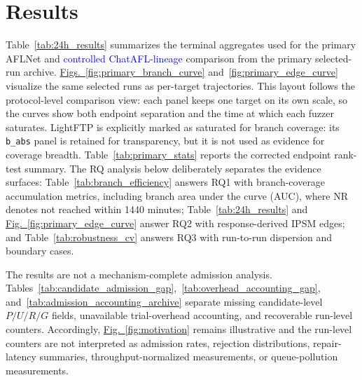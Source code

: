 \documentclass[final,5p,times,number]{elsarticle}
\newcommand{\figref}[1]{\hyperref[#1]{Fig.~\ref*{#1}}}
\newcommand{\figsref}[2]{\hyperref[#1]{Figs.~\ref*{#1}} and~\hyperref[#2]{\ref*{#2}}}
\begin{document}
\section{Results}

Table~\ref{tab:24h_results} summarizes the terminal aggregates used for the primary AFLNet and \textcolor{blue}{controlled ChatAFL-lineage} comparison from the primary selected-run archive. \figsref{fig:primary_branch_curve}{fig:primary_edge_curve} visualize the same selected runs as per-target trajectories. This layout follows the protocol-level comparison view: each panel keeps one target on its own scale, so the curves show both endpoint separation and the time at which each fuzzer saturates. LightFTP is explicitly marked as saturated for branch coverage: its \texttt{b\_abs} panel is retained for transparency, but it is not used as evidence for coverage breadth. Table~\ref{tab:primary_stats} reports the corrected endpoint rank-test summary. The RQ analysis below deliberately separates the evidence surfaces: Table~\ref{tab:branch_efficiency} answers RQ1 with branch-coverage accumulation metrics, including branch area under the curve (AUC), where NR denotes not reached within 1440 minutes; Table~\ref{tab:24h_results} and \figref{fig:primary_edge_curve} answer RQ2 with response-derived IPSM edges; and Table~\ref{tab:robustness_cv} answers RQ3 with run-to-run dispersion and boundary cases.

The results are not a mechanism-complete admission analysis. Tables~\ref{tab:candidate_admission_gap},~\ref{tab:overhead_accounting_gap}, and~\ref{tab:admission_accounting_archive} separate missing candidate-level $P/U/R/G$ fields, unavailable trial-overhead accounting, and recoverable run-level counters. Accordingly, \figref{fig:motivation} remains illustrative and the run-level counters are not interpreted as admission rates, rejection distributions, repair-latency summaries, throughput-normalized measurements, or queue-pollution measurements.
\end{document}
